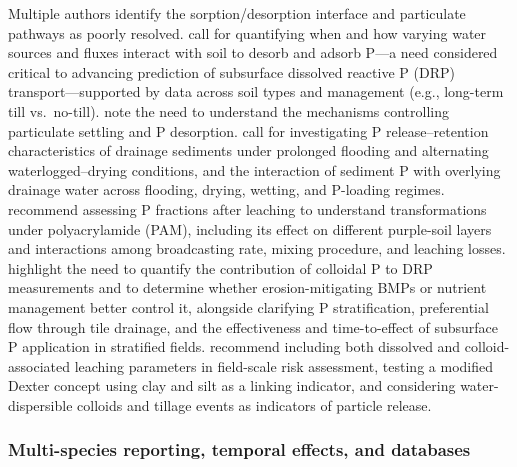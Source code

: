 Multiple authors identify the sorption/desorption interface and particulate pathways as poorly resolved. \textcite{Mumbi2025} call for quantifying when and how varying water sources and fluxes interact with soil to desorb and adsorb P---a need considered critical to advancing prediction of subsurface dissolved reactive P (DRP) transport---supported by data across soil types and management (e.g., long-term till vs.\ no-till). \textcite{Flores2021} note the need to understand the mechanisms controlling particulate settling and P desorption. \textcite{Nguyen2002} call for investigating P release--retention characteristics of drainage sediments under prolonged flooding and alternating waterlogged--drying conditions, and the interaction of sediment P with overlying drainage water across flooding, drying, wetting, and P-loading regimes. \textcite{Jiang2010} recommend assessing P fractions after leaching to understand transformations under polyacrylamide (PAM), including its effect on different purple-soil layers and interactions among broadcasting rate, mixing procedure, and leaching losses. \textcite{Wilson2019} highlight the need to quantify the contribution of colloidal P to DRP measurements and to determine whether erosion-mitigating BMPs or nutrient management better control it, alongside clarifying P stratification, preferential flow through tile drainage, and the effectiveness and time-to-effect of subsurface P application in stratified fields. \textcite{Norgaard2013} recommend including both dissolved and colloid-associated leaching parameters in field-scale risk assessment, testing a modified Dexter concept using clay and silt as a linking indicator, and considering water-dispersible colloids and tillage events as indicators of particle release.

\subsubsection{Multi-species reporting, temporal effects, and databases}


